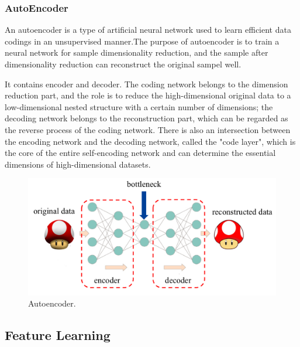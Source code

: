 \documentclass{article}
\begin{document}
\subsubsection{AutoEncoder}
\indent An autoencoder is a type of artificial neural network used to learn efficient data codings in an unsupervised manner.\cite{kramer1991nonlinear}The purpose of autoencoder is to train a neural network for sample dimensionality reduction, and the sample after dimensionality reduction can reconstruct the original sampel well. \par
\indent It contains encoder and decoder. The coding network belongs to the dimension reduction part, and the role is to reduce the high-dimensional original data to a low-dimensional nested structure with a certain number of dimensions; the decoding network belongs to the reconstruction part, which can be regarded as the reverse process of the coding network. There is also an intersection between the encoding network and the decoding network, called the "code layer", which is the core of the entire self-encoding network  and can determine the essential dimensions of high-dimensional datasets.
\begin{figure}[htbp]
	\centering
	\includegraphics[scale=0.2]{figures/Autoencoder.jpg}
	\caption{Autoencoder.}
	\label{fig:autoencoder}
\end{figure}\par
\subsection{Feature Learning}
\end{document}
